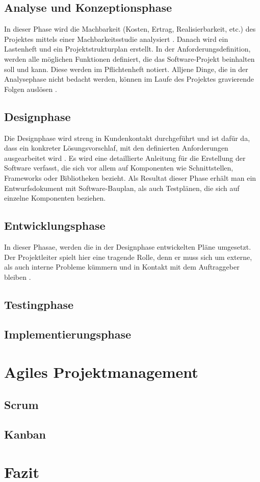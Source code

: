 \subsection{Analyse und Konzeptionsphase}
In dieser Phase wird die Machbarkeit (Kosten, Ertrag, Realisierbarkeit, etc.) des Projektes mittels einer Machbarkeitsstudie analysiert \cite{pm-wasserfall-ionos}. Danach wird ein Lastenheft und ein Projektstrukturplan erstellt. In der Anforderungsdefinition, werden alle möglichen Funktionen definiert, die das Software-Projekt beinhalten soll und kann. Diese werden im Pflichtenheft notiert. Alljene Dinge, die in der Analysephase nicht bedacht werden, können im Laufe des Projektes gravierende Folgen auslösen \cite{pm-wasserfall-online}.
\subsection{Designphase}
Die Designphase wird streng in Kundenkontakt durchgeführt \cite{pm-wasserfall-online} und ist dafür da, dass ein konkreter Lösungsvorschlaf, mit den definierten Anforderungen ausgearbeitet wird \cite{pm-wasserfall-ionos}. Es wird eine detaillierte Anleitung für die Erstellung der Software verfasst, die sich vor allem auf Komponenten wie Schnittstellen, Frameworks oder Bibliotheken bezieht. Als Resultat dieser Phase erhält man ein Entwurfsdokument mit Software-Bauplan, als auch Testplänen, die sich auf einzelne Komponenten beziehen.
\subsection{Entwicklungsphase}
In dieser Phasae, werden die in der Designphase entwickelten Pläne umgesetzt. Der Projektleiter spielt hier eine tragende Rolle, denn er muss sich um externe, als auch interne Probleme kümmern und in Kontakt mit dem Auftraggeber bleiben \cite{pm-wasserfall-online}. 
\subsection{Testingphase}

\subsection{Implementierungsphase}
\section{Agiles Projektmanagement}
\label{chapter:agil-pm}
\subsection{Scrum}
\subsection{Kanban}
\section{Fazit}